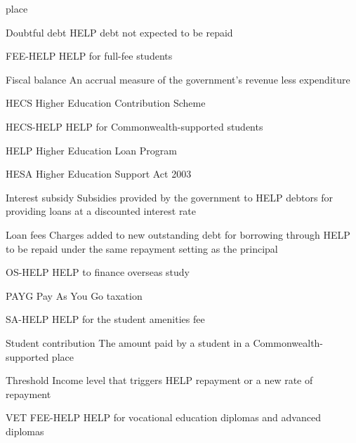 \documentclass[embargoed]{grattan}
\begin{document}
place

Doubtful debt HELP debt not expected to be repaid

FEE-HELP HELP for full-fee students

Fiscal balance An accrual measure of the government's revenue less expenditure

HECS Higher Education Contribution Scheme

HECS-HELP HELP for Commonwealth-supported students

HELP Higher Education Loan Program

HESA Higher Education Support Act 2003

Interest subsidy Subsidies provided by the government to HELP debtors for providing loans at a discounted interest rate

Loan fees Charges added to new outstanding debt for borrowing through HELP to be repaid under the same repayment setting as the principal

OS-HELP HELP to finance overseas study

PAYG Pay As You Go taxation

SA-HELP HELP for the student amenities fee

Student contribution The amount paid by a student in a Commonwealth-supported place

Threshold Income level that triggers HELP repayment or a new rate of repayment

VET FEE-HELP HELP for vocational education diplomas and advanced diplomas
\end{document}
